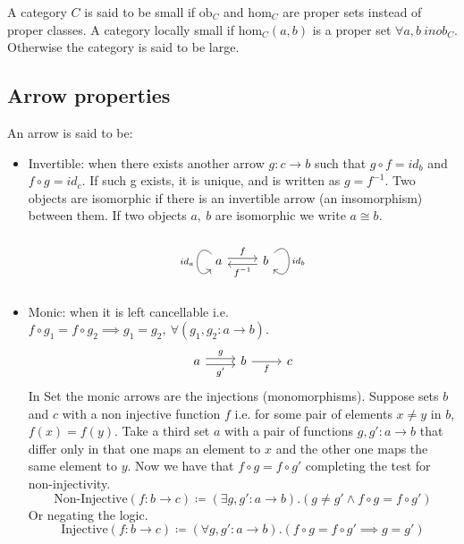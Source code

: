 \noindent A category $C$ is said to be small if $\mathrm{ob}_C$ and
$\mathrm{hom}_C$ are proper sets instead of proper classes. A category locally
small if $\mathrm{hom}_C(a, b)$ is a proper set $\forall a, b\ in ob_C$.
Otherwise the category is said to be large. \parencite{awodey:category_theory}
\medskip

\subsection{Arrow properties}
An arrow is said to be: \parencite{maclane:working_mathematician}
\begin{itemize}
  \item Invertible: when there exists another arrow $g:c \to b$ such that
    $g\circ f = id_b$ and $f\circ g = id_c$. If such g exists, it is unique, and
    is written as $g= f^{-1}$. Two objects are isomorphic if there is an
    invertible arrow (an insomorphism) between them. If two objects $a,\ b$
    are isomorphic we write $a\cong b$.
    \[\begin{tikzcd}
      a & b
      \arrow["f", shift left=1, from=1-1, to=1-2]
      \arrow["{f^{-1}}", shift left=1, from=1-2, to=1-1]
      \arrow["id_a"', out=90+45, in=-90-45, looseness=4.5, from=1-1, to=1-1]
      \arrow["id_b", out=45, in=-45, looseness=4.5, from=1-2, to=1-2]
    \end{tikzcd}\]
  \item Monic: when it is left cancellable i.e.
    $f \circ g_1 = f \circ g_2 \implies g_1 = g_2,\ \forall (g_1, g_2:a\to b)$.
    \[\begin{tikzcd}
      a & b & c
      \arrow["g", shift left=1, from=1-1, to=1-2]
      \arrow["{g'}"', shift right=1, from=1-1, to=1-2]
      \arrow["f"', from=1-2, to=1-3]
    \end{tikzcd}\]
    In Set the monic arrows are the injections (monomorphisms).
    Suppose sets $b$ and $c$ with a non injective function $f$ i.e. for some
    pair of elements $x \neq y$ in $b$, $f(x) = f(y)$. Take a third set $a$ with
    a pair of functions $g, g':a\to b$ that differ only in that one maps an
    element to $x$ and the other one maps the same element to $y$. Now we have
    that $f\circ g = f\circ g'$ completing the test for non-injectivity.
    \[\text{Non-Injective}(f:b\to c)
      \coloneq(\exists g, g':a\to b).(g \neq g' \land f\circ g = f\circ g')\]
    Or negating the logic.
    \[\text{Injective}(f:b\to c)
      \coloneq(\forall g, g':a\to b).(f\circ g = f\circ g' \implies g=g')\]


\end{itemize}
